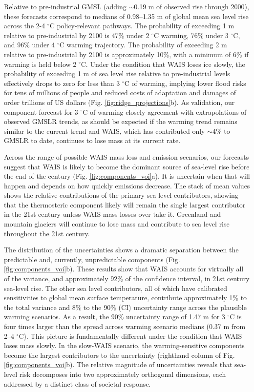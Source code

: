 \documentclass[12pt]{article}
\begin{document}
Relative to pre-industrial GMSL (adding $\sim$0.19 m of observed rise through 2000), these forecasts correspond to medians of 0.98--1.35 m of global mean sea level rise across the 2-4 $^\circ$C policy-relevant pathways. The probability of exceeding 1 m relative to pre-industrial by 2100 is 47\% under 2 $^\circ$C warming, 76\% under 3 $^\circ$C, and 96\% under 4 $^\circ$C warming trajectory. The probability of exceeding 2 m relative to pre-industrial by 2100 is approximately 10\%, with a minimum of 6\% if warming is held below 2 $^\circ$C. Under the condition that WAIS loses ice slowly, the probability of exceeding 1 m of sea level rise relative to pre-industrial levels effectively drops to zero for less than 3 $^\circ$C of warming, implying lower flood risks for tens of millions of people and reduced costs of adaptation and damages of order trillions of US dollars (Fig. \ref{fig:ridge_projections}b). As validation, our component forecast for 3 $^\circ$C of warming closely agreement with extrapolations of observed GMSLR trends, as should be expected if the warming trend remains similar to the current trend and WAIS, which has contributed only $\sim$4\% to GMSLR to date, continues to lose mass at its current rate. 

Across the range of possible WAIS mass loss and emission scenarios, our forecasts suggest that WAIS is likely to become the dominant source of sea-level rise before the end of the century (Fig. \ref{fig:components_voi}a). It is uncertain when that will happen and depends on how quickly emissions decrease. The stack of mean values shows the relative contributions of the primary sea-level contributors, showing that the thermosteric component likely will remain the single largest contributor in the 21st century unless WAIS mass losses over take it. Greenland and mountain glaciers will continue to lose mass and contribute to sea level rise throughout the 21st century. 

The distribution of the uncertainties shows a dramatic separation between the predictable and, currently, unpredictable components (Fig. \ref{fig:components_voi}b). These results show that WAIS accounts for virtually all of the variance, and approximately 92\% of the confidence interval, in 21st century sea-level rise. The other sea level contributors, all of which have calibrated sensitivities to global mean surface temperature, contribute approximately 1\% to the total variance and 8\% to the 90\% (CI) uncertainty range across the plausible warming scenarios. As a result, the 90\% uncertainty range of 1.47 m for 3 $^\circ$C is four times larger than the spread across warming scenario medians (0.37 m from 2--4 $^\circ$C). This picture is fundamentally different under the condition that WAIS loses mass slowly. In the slow-WAIS scenario, the warming-sensitive components become the largest contributors to the uncertainty (righthand column of Fig. \ref{fig:components_voi}b). The relative magnitude of uncertainties reveals that sea-level risk decomposes into two approximately orthogonal dimensions, each addressed by a distinct class of societal response.
\end{document}
